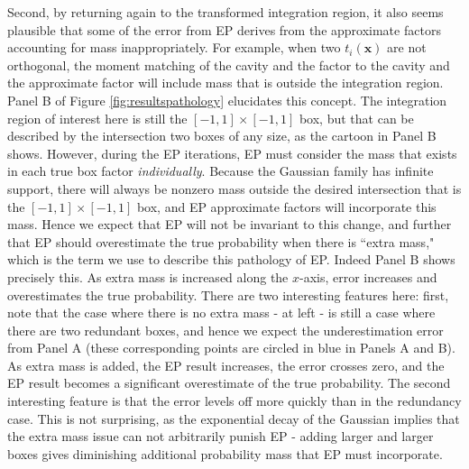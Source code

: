 \documentclass[twoside,11pt]{article}
\def\x{{\mathbf x}}
\begin{document}
Second, by returning again to the transformed integration region, it also seems plausible that some of the error from EP derives from the approximate factors accounting for mass inappropriately.  For example, when two $t_i(\x)$ are not orthogonal, the moment matching of the cavity and the factor  to the cavity and the approximate factor will include mass that is outside the integration region.  Panel B of Figure \ref{fig:resultspathology} elucidates this concept.   The integration region of interest here is  still the $[-1,1] \times [-1,1]$ box, but that can be described by the intersection two boxes of any size, as the cartoon in Panel B shows.   However, during the EP iterations, EP must consider the mass that exists in each true box factor \emph{individually}.  Because the Gaussian family has infinite support, there will always be nonzero mass outside the desired intersection that is  the $[-1,1] \times [-1,1]$ box, and EP approximate factors will incorporate this mass.  Hence we expect that EP will not be invariant to this change, and further that EP should overestimate the true probability when there is ``extra mass," which is the term we use to describe this pathology of EP.  Indeed Panel B shows precisely this.  As extra mass is increased along the $x$-axis, error increases and overestimates the true probability.  There are two interesting features here: first, note that the case where there is no extra mass - at left - is still a case where there are two redundant boxes, and hence we expect the underestimation error from Panel A (these corresponding points are circled in blue in Panels A and B).   As extra mass is added, the EP result increases, the error crosses zero, and the EP result becomes a significant overestimate of the true probability.  The second interesting feature is that the error levels off more quickly than in the redundancy case.  This is not surprising, as the exponential decay of the Gaussian implies that the extra mass issue can not arbitrarily punish EP - adding larger and larger boxes gives diminishing additional probability mass that EP must incorporate.
\end{document}
